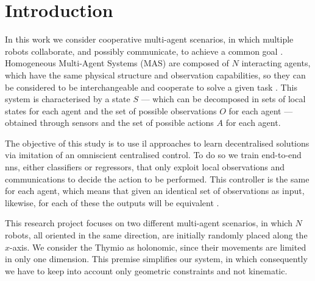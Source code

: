 \chapter*{Introduction}
\markboth{}{}
\label{chap:intro}
In this work we consider cooperative multi-agent scenarios, in which multiple 
robots collaborate, and possibly communicate, to achieve a common goal 
\cite[][]{ismail2018survey}.
Homogeneous Multi-Agent Systems (MAS) are composed of $N$ interacting 
agents, which have the same physical structure and observation capabilities, so 
they can be considered to be interchangeable and cooperate to solve a given 
task \cite[][]{stone2000multiagent, vsovsic2016inverse}.
This system is characterised by a state $S$ — which can be decomposed in sets of 
local states for each agent and the set of possible observations $O$ for each agent 
— obtained through sensors and the set of possible actions  $A$ for each agent.

The objective of this study is to use \gls{il} approaches to learn decentralised 
solutions via imitation of an omniscient centralised control. To do so we train 
end-to-end \glspl{nn}, either classifiers or regressors, that only exploit local 
observations and communications to decide the action to be performed. This 
controller is the same for each agent, which means that given an identical set of 
observations as input, likewise, for each of these the outputs will be equivalent 
\cite[][]{ross2011reduction, tolstaya2020learning}.

This research project focuses on two different multi-agent scenarios, in which $N$ 
robots, all oriented in the same direction, are initially randomly placed along the 
$x$-axis. We consider the Thymio as holonomic, since their movements are 
limited in only one dimension. This premise simplifies our system, in which 
consequently we have to keep into account only geometric constraints and not 
kinematic.

